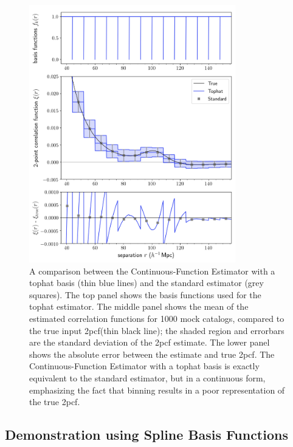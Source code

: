 \documentclass[modern]{aastex62}
\newcommand{\cf}{2pcf\xspace} %
\newcommand{\Est}{The Continuous-Function Estimator\xspace}
\newcommand{\est}{the Continuous-Function Estimator\xspace}
\begin{document}
\begin{figure}[t]
\centering
    \includegraphics[width=0.8\textwidth]{xicomparison_2e-4_tophat8_theory8}
    \caption{A comparison between \est with a tophat basis (thin blue lines) and the standard estimator (grey squares). The top panel shows the basis functions used for the tophat estimator. The middle panel shows the mean of the estimated correlation functions for 1000 mock catalogs, compared to the true input \cf (thin black line); the shaded region and errorbars are the standard deviation of the \cf estimate. The lower panel shows the absolute error between the estimate and true \cf. \Est with a tophat basis is exactly equivalent to the standard estimator, but in a continuous form, emphasizing the fact that binning results in a poor representation of the true \cf.}
    \label{fig:tophat}
\end{figure}

\subsection{Demonstration using Spline Basis Functions}
\label{sec:spline}
\end{document}
